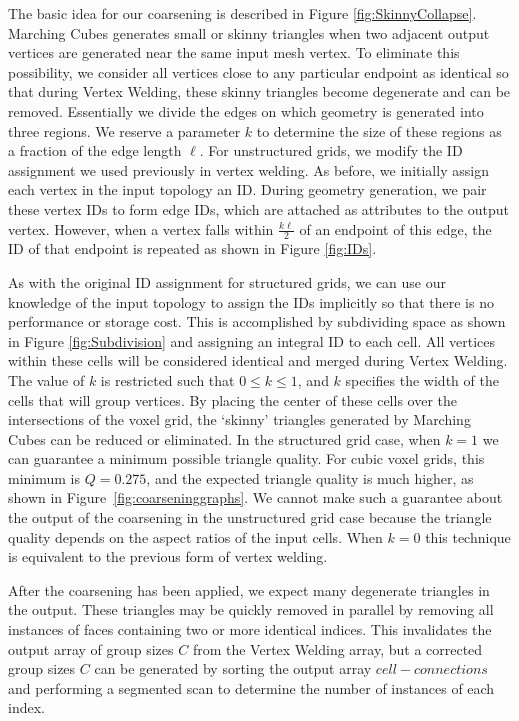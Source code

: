 \documentclass[10pt,journal,cspaper,compsoc]{IEEEtran}
\begin{document}
The basic idea for our coarsening is described in Figure \ref{fig:SkinnyCollapse}. Marching Cubes generates small or skinny triangles when two adjacent output vertices are generated near the same input mesh vertex. To eliminate this possibility, we consider all vertices close to any particular endpoint as identical so that during Vertex Welding, these skinny triangles become degenerate and can be removed. Essentially we divide the edges on which geometry is generated into three regions. We reserve a parameter $k$ to determine the size of these regions as a fraction of the edge length $\ell$. For unstructured grids, we modify the ID assignment we used previously in vertex welding. As before, we initially assign each vertex in the input topology an ID. During geometry generation, we pair these vertex IDs to form edge IDs, which are attached as attributes to the output vertex. However, when a vertex falls within $\frac{k\ell}{2}$ of an endpoint of this edge, the ID of that endpoint is repeated as shown in Figure \ref{fig:IDs}.

As with the original ID assignment for structured grids, we can use our knowledge of the input topology to assign the IDs implicitly so that there is no performance or storage cost. This is accomplished by subdividing space as shown in Figure \ref{fig:Subdivision} and assigning an integral ID to each cell. All vertices within these cells will be considered identical and merged during Vertex Welding. The value of $k$ is restricted such that $0\leq k \leq 1$, and $k$ specifies the width of the cells that will group vertices. By placing the center of these cells over the intersections of the voxel grid, the `skinny' triangles generated by Marching Cubes can be reduced or eliminated. In the structured grid case, when $k=1$ we can guarantee a minimum possible triangle quality. For cubic voxel grids, this minimum is $Q=0.275$, and the expected triangle quality is much higher, as shown in Figure~\ref{fig:coarseninggraphs}. We cannot make such a guarantee about the output of the coarsening in the unstructured grid case because the triangle quality depends on the aspect ratios of the input cells. When $k=0$ this technique is equivalent to the previous form of vertex welding.  

After the coarsening has been applied, we expect many degenerate triangles in the output. These triangles may be quickly removed in parallel by removing
all instances of faces containing two or more identical indices. This invalidates the output array of group sizes $C$ from the Vertex Welding array, but a corrected group sizes $C$ can be generated by sorting the output array $cell-connections$ and performing a segmented scan to determine the number of instances of each index.
\end{document}
